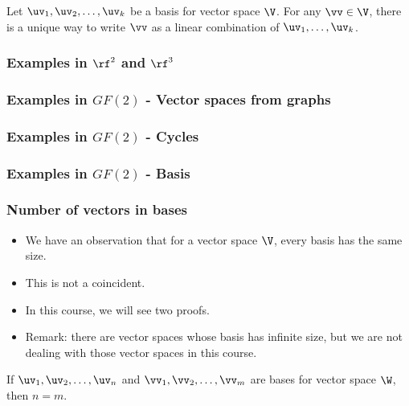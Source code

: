 \begin{frame}
  \begin{lemma}
    Let $\uv_1,\uv_2,\ldots,\uv_k$ be a basis for vector space $\V$.
    For any $\vv\in\V$, there is a unique way to write $\vv$ as a
    linear combination of $\uv_1,\ldots,\uv_k$.
  \end{lemma}
\end{frame}

\begin{frame}
  \frametitle{Examples in $\rf^2$ and $\rf^3$}
\end{frame}

\begin{frame}
  \frametitle{Examples in $GF(2)$ - Vector spaces from graphs}
\end{frame}

\begin{frame}
  \frametitle{Examples in $GF(2)$ - Cycles}
\end{frame}

\begin{frame}
  \frametitle{Examples in $GF(2)$ - Basis}
\end{frame}

\begin{frame}
  \frametitle{Number of vectors in bases}
  \begin{itemize}
  \item We have an observation that for a vector space $\V$, every basis has the same size.
    \pause
  \item This is not a coincident.
  \item In this course, we will see two proofs.
    \pause
  \item Remark: there are vector spaces whose basis has infinite size,
    but we are not dealing with those vector spaces in this course.
  \end{itemize}
\end{frame}

\begin{frame}
  \begin{theorem}
    If $\uv_1,\uv_2,\ldots,\uv_n$ and $\vv_1,\vv_2,\ldots,\vv_m$ are bases for vector space $\W$, then $n=m$.
  \end{theorem}
\end{frame}

